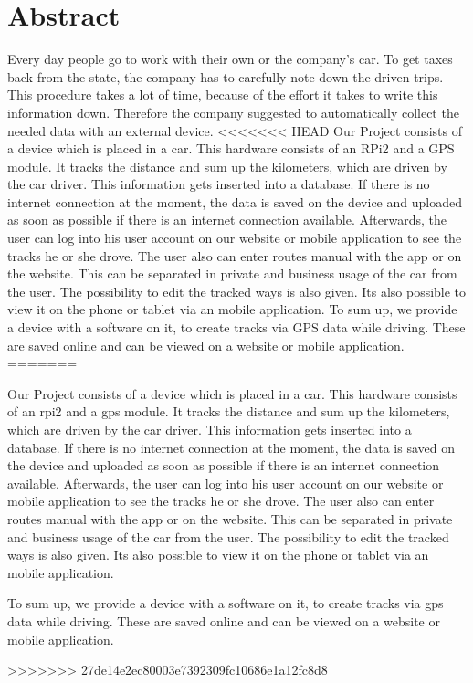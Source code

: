 \chapter*{Abstract}
Every day people go to work with their own or the company's car. To get taxes back from the state, the company has to carefully note down the driven trips. This procedure takes a lot of time,  because of the effort it takes to write this information down. Therefore the company suggested to automatically collect the needed data with an external device.
<<<<<<< HEAD
\newline \newline
Our Project consists of a device which is placed in a car. This hardware consists of an RPi2 and a GPS module. It tracks the distance and sum up the kilometers, which are driven by the car driver. This information gets inserted into a database. If there is no internet connection at the moment, the data is saved on the device and uploaded as soon as possible if there is an internet connection available. Afterwards, the user can log into his user account on our website or mobile application to see the tracks he or she drove. The user also can enter routes manual with the app or on the website. This can be separated in private and business usage of the car from the user. The possibility to edit the tracked ways is also given. Its also possible to view it on the phone or tablet via an mobile application.
\newline \newline
To sum up, we provide a device with a software on it, to create tracks via GPS data while driving. These are saved online and can be viewed on a website or mobile application.
=======

Our Project consists of a device which is placed in a car. This hardware consists of an \gls{rpi2} and a \gls{gps} module. It tracks the distance and sum up the kilometers, which are driven by the car driver. This information gets inserted into a database. If there is no internet connection at the moment, the data is saved on the device and uploaded as soon as possible if there is an internet connection available. Afterwards, the user can log into his user account on our website or mobile application to see the tracks he or she drove. The user also can enter routes manual with the app or on the website. This can be separated in private and business usage of the car from the user. The possibility to edit the tracked ways is also given. Its also possible to view it on the phone or tablet via an mobile application.

To sum up, we provide a device with a software on it, to create tracks via \gls{gps} data while driving. These are saved online and can be viewed on a website or mobile application.


>>>>>>> 27de14e2ec80003e7392309fc10686e1a12fc8d8
